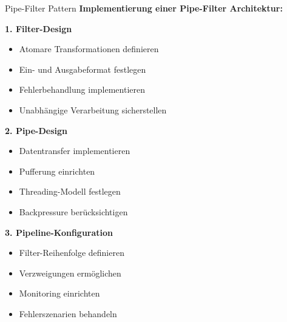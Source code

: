 \begin{KR}{Pipe-Filter Pattern}
\textbf{Implementierung einer Pipe-Filter Architektur:}

\textbf{1. Filter-Design}
\begin{itemize}
    \item Atomare Transformationen definieren
    \item Ein- und Ausgabeformat festlegen
    \item Fehlerbehandlung implementieren
    \item Unabhängige Verarbeitung sicherstellen
\end{itemize}

\begin{minipage}[t]{0.5\textwidth}
\textbf{2. Pipe-Design}
\begin{itemize}
    \item Datentransfer implementieren
    \item Pufferung einrichten
    \item Threading-Modell festlegen
    \item Backpressure berücksichtigen
\end{itemize}
\end{minipage}
\begin{minipage}[t]{0.5\textwidth}
\textbf{3. Pipeline-Konfiguration}
\begin{itemize}
    \item Filter-Reihenfolge definieren
    \item Verzweigungen ermöglichen
    \item Monitoring einrichten
    \item Fehlerszenarien behandeln
\end{itemize}
\end{minipage}
\end{KR}

